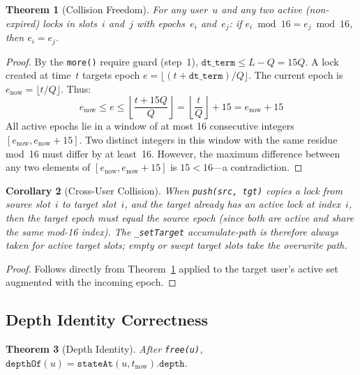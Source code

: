 \documentclass[10pt,a4paper,twocolumn]{article}
\theoremstyle{definition}
\theoremstyle{plain}
\newtheorem{theorem}{Theorem}[section]
\newtheorem{corollary}[theorem]{Corollary}
\theoremstyle{remark}
\begin{document}
\begin{theorem}[Collision Freedom]
\label{thm:collision}
For any user~$u$ and any two active (non-expired) locks in slots~$i$ and~$j$ with epochs~$e_i$ and~$e_j$: if $e_i \bmod 16 = e_j \bmod 16$, then $e_i = e_j$.
\end{theorem}

\begin{proof}
By the \texttt{more()} require guard (step~1), $\texttt{dt\_term} \leq L - Q = 15Q$. A lock created at time~$t$ targets epoch $e = \lfloor(t{+}\texttt{dt\_term})/Q\rfloor$. The current epoch is $e_{\text{now}} = \lfloor t/Q \rfloor$. Thus:
\[
e_{\text{now}} \leq e \leq \left\lfloor \frac{t + 15Q}{Q} \right\rfloor = \left\lfloor \frac{t}{Q} \right\rfloor + 15 = e_{\text{now}} + 15
\]
All active epochs lie in a window of at most 16 consecutive integers $[e_{\text{now}}, e_{\text{now}}{+}15]$. Two distinct integers in this window with the same residue mod~16 must differ by at least~16. However, the maximum difference between any two elements of $[e_{\text{now}}, e_{\text{now}}{+}15]$ is $15 < 16$---a contradiction.
\end{proof}

\begin{corollary}[Cross-User Collision]
\label{cor:cross-user}
When \texttt{push(src, tgt)} copies a lock from source slot~$i$ to target slot~$i$, and the target already has an active lock at index~$i$, then the target epoch must equal the source epoch (since both are active and share the same mod-16 index). The \texttt{\_setTarget} accumulate-path is therefore always taken for active target slots; empty or swept target slots take the overwrite path.
\end{corollary}

\begin{proof}
Follows directly from Theorem~\ref{thm:collision} applied to the target user's active set augmented with the incoming epoch.
\end{proof}

\subsection{Depth Identity Correctness}

\begin{theorem}[Depth Identity]
\label{thm:depth-correct}
After \texttt{free(u)}, $\texttt{depthOf}(u) = \texttt{stateAt}(u, t_{\text{now}}).\texttt{depth}$.
\end{theorem}
\end{document}
